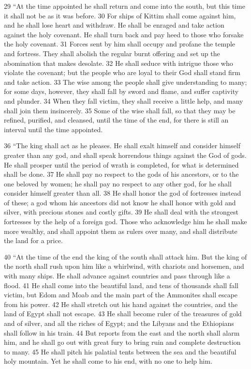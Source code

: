 29 ``At the time appointed he shall return and come into the south, but this 
time it shall not be as it was before. 30 For ships of Kittim shall come 
against him, and he shall lose heart and withdraw. He shall be enraged and take 
action against the holy covenant. He shall turn back and pay heed to those who 
forsake the holy covenant. 31 Forces sent by him shall occupy and profane the 
temple and fortress. They shall abolish the regular burnt offering and set up 
the abomination that makes desolate. 32 He shall seduce with intrigue those who 
violate the covenant; but the people who are loyal to their God shall stand 
firm and take action. 33 The wise among the people shall give understanding to 
many; for some days, however, they shall fall by sword and flame, and suffer 
captivity and plunder. 34 When they fall victim, they shall receive a little 
help, and many shall join them insincerely. 35 Some of the wise shall fall, so 
that they may be refined, purified, and cleansed, until the time of the end, 
for there is still an interval until the time appointed.

36 ``The king shall act as he pleases. He shall exalt himself and consider 
himself greater than any god, and shall speak horrendous things against the God 
of gods. He shall prosper until the period of wrath is completed, for what is 
determined shall be done. 37 He shall pay no respect to the gods of his 
ancestors, or to the one beloved by women; he shall pay no respect to any other 
god, for he shall consider himself greater than all. 38 He shall honor the god 
of fortresses instead of these; a god whom his ancestors did not know he shall 
honor with gold and silver, with precious stones and costly gifts. 39 He shall 
deal with the strongest fortresses by the help of a foreign god. Those who 
acknowledge him he shall make more wealthy, and shall appoint them as rulers 
over many, and shall distribute the land for a price.

40 ``At the time of the end the king of the south shall attack him. But the 
king of the north shall rush upon him like a whirlwind, with chariots and 
horsemen, and with many ships. He shall advance against countries and pass 
through like a flood. 41 He shall come into the beautiful land, and tens of 
thousands shall fall victim, but Edom and Moab and the main part of the 
Ammonites shall escape from his power. 42 He shall stretch out his hand against 
the countries, and the land of Egypt shall not escape. 43 He shall become ruler 
of the treasures of gold and of silver, and all the riches of Egypt; and the 
Libyans and the Ethiopians shall follow in his train. 44 But reports from the 
east and the north shall alarm him, and he shall go out with great fury to bring 
ruin and complete destruction to many. 45 He shall pitch his palatial tents 
between the sea and the beautiful holy mountain. Yet he shall come to his end, 
with no one to help him.
